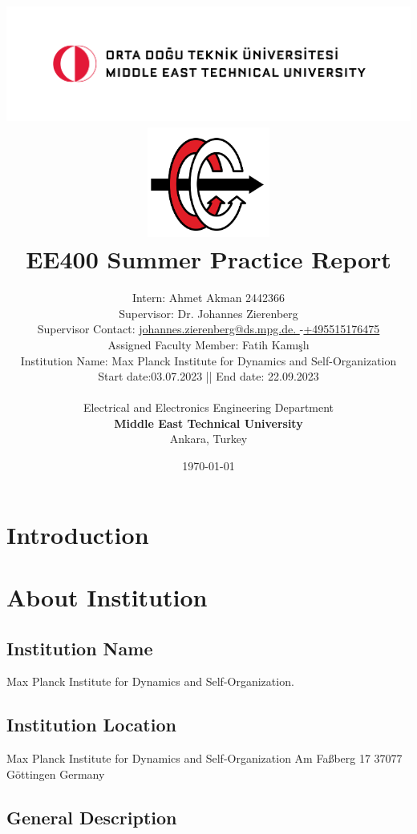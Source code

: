 \documentclass[letterpaper,12pt]{article}
\title{
\includegraphics[width=17cm]{odtu.png} \\
\includegraphics[width=4cm]{eee.png} \\
\vspace*{0.5in}
\textbf{EE400 Summer Practice Report}
\vspace*{0.25in}
}
\author{Intern: Ahmet Akman 2442366\\
Supervisor: Dr. Johannes Zierenberg\\
Supervisor Contact: \href{mailto: johannes.zierenberg@ds.mpg.de}{ johannes.zierenberg@ds.mpg.de. }-\href{tel:+495515176475}{+495515176475}\\
Assigned Faculty Member: Fatih Kamışlı\\
Institution Name: Max Planck Institute for Dynamics and Self-Organization\\
Start date:03.07.2023 || End date: 22.09.2023\\
        \vspace*{0.25in} \\
        Electrical and Electronics Engineering Department\\
        \textbf{Middle East Technical University}\\
        Ankara, Turkey
       } \date{\today}
\begin{document}


%


\maketitle

\newpage
\tableofcontents
\newpage
\section{Introduction}
\section{About Institution}
\subsection{Institution Name}
Max Planck Institute for Dynamics and Self-Organization.
\subsection{Institution Location}
Max Planck Institute for Dynamics and Self-Organization
Am Faßberg 17
37077 Göttingen
Germany
\subsection{General Description}
\end{document}
